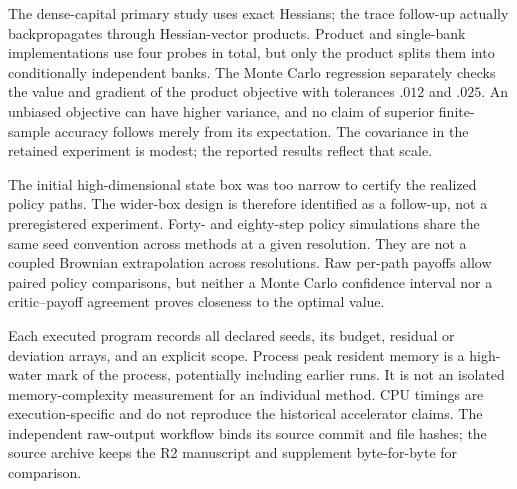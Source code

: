 The dense-capital primary study uses exact Hessians; the trace follow-up actually backpropagates through Hessian-vector products. Product and single-bank implementations use four probes in total, but only the product splits them into conditionally independent banks. The Monte Carlo regression separately checks the value and gradient of the product objective with tolerances $.012$ and $.025$. An unbiased objective can have higher variance, and no claim of superior finite-sample accuracy follows merely from its expectation. The covariance in the retained experiment is modest; the reported results reflect that scale.

The initial high-dimensional state box was too narrow to certify the realized policy paths. The wider-box design is therefore identified as a follow-up, not a preregistered experiment. Forty- and eighty-step policy simulations share the same seed convention across methods at a given resolution. They are not a coupled Brownian extrapolation across resolutions. Raw per-path payoffs allow paired policy comparisons, but neither a Monte Carlo confidence interval nor a critic--payoff agreement proves closeness to the optimal value.

Each executed program records all declared seeds, its budget, residual or deviation arrays, and an explicit scope. Process peak resident memory is a high-water mark of the process, potentially including earlier runs. It is not an isolated memory-complexity measurement for an individual method. CPU timings are execution-specific and do not reproduce the historical accelerator claims. The independent raw-output workflow binds its source commit and file hashes; the source archive keeps the R2 manuscript and supplement byte-for-byte for comparison.
